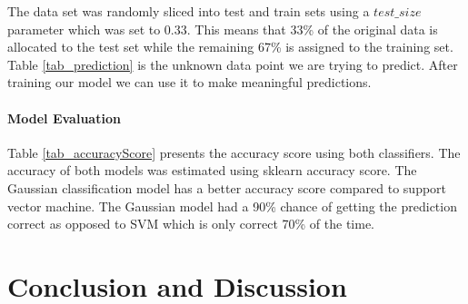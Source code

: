 \documentclass[12pt, letterpaper, titlepage]{report}
\begin{document}
The data set was randomly sliced into test and train sets using a $test\_size$ parameter which was set to $0.33$. This means that 33\% of the original data is allocated to the test set while the remaining 67\% is assigned to the training set. Table \ref{tab_prediction} is the unknown data point we are trying to predict. After training our model we can use it to make meaningful predictions.

\subsubsection{Model Evaluation}
Table \ref{tab_accuracyScore} presents the accuracy score using both classifiers. The accuracy of both models was estimated using sklearn accuracy score. The Gaussian classification model has a better accuracy score compared to support vector machine. The Gaussian model had a 90\% chance of getting the prediction correct as opposed to SVM which is only correct 70\% of the time.





\chapter{\textbf{Conclusion and Discussion}}




\end{document}
